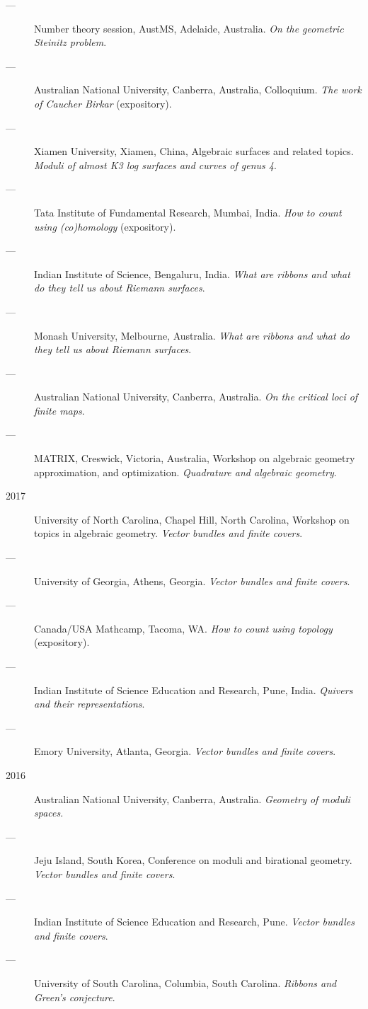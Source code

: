\documentclass[11pt]{article}
\begin{document}
\begin{description}
\item[{---}] Number theory session,  AustMS, Adelaide, Australia. \emph{On the geometric Steinitz problem}.
\item[{---}] Australian National University, Canberra, Australia, Colloquium. \emph{The work of Caucher Birkar} (expository).
\item[{---}] Xiamen University, Xiamen, China, Algebraic surfaces and related topics. \emph{Moduli of almost K3 log surfaces and curves of genus 4}.
\item[{---}] Tata Institute of Fundamental Research, Mumbai, India. \emph{How to count using (co)homology} (expository).
\item[{---}] Indian Institute of Science, Bengaluru, India. \emph{What are ribbons and what do they tell us about Riemann surfaces}.
\item[{---}] Monash University, Melbourne, Australia. \emph{What are ribbons and what do they tell us about Riemann surfaces}.
\item[{---}] Australian National University, Canberra, Australia. \emph{On the critical loci of finite maps}.
\item[{---}] MATRIX, Creswick, Victoria, Australia, Workshop on algebraic geometry approximation, and optimization. \emph{Quadrature and algebraic geometry}.
\item[{2017}] University of North Carolina, Chapel Hill, North Carolina, Workshop on topics in algebraic geometry. \emph{Vector bundles and finite covers}.
\item[{---}] University of Georgia, Athens, Georgia. \emph{Vector bundles and finite covers}.
\item[{---}] Canada/USA Mathcamp, Tacoma, WA. \emph{How to count using topology} (expository).
\item[{---}] Indian Institute of Science Education and Research, Pune, India. \emph{Quivers and their representations}.
\item[{---}] Emory University, Atlanta, Georgia. \emph{Vector bundles and finite covers}.
\item[{2016}] Australian National University, Canberra, Australia. \emph{Geometry of moduli spaces}.
\item[{---}] Jeju Island, South Korea, Conference on moduli and birational geometry. \emph{Vector bundles and finite covers}.
\item[{---}] Indian Institute of Science Education and Research, Pune. \emph{Vector bundles and finite covers}.
\item[{---}] University of South Carolina, Columbia, South Carolina. \emph{Ribbons and Green's conjecture}.

\end{description}
\end{document}
